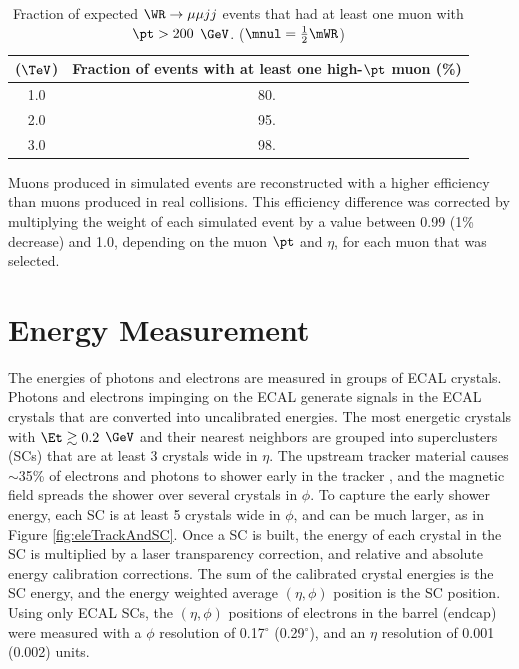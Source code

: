 \begin{table}[h]
	\caption{Fraction of expected $\WR \rightarrow \mu\mu jj$ events that had at least one muon with $\pt > 200$ $\GeV$. 
	($\mnul = \frac{1}{2}\mWR$)}
	\label{tab:wrHighPtMuons}
	\centering
	\begin{tabular}{c|c}
		\mWR ($\TeV$) & Fraction of events with at least one high-$\pt$ muon (\%) \\  \hline
		1.0 &  80.  \\
		2.0 &  95.  \\ 
		3.0 &  98.  \\ \hline
	\end{tabular}
\end{table}

Muons produced in simulated events are reconstructed with a higher efficiency than muons produced in real collisions.  This efficiency 
difference was corrected by multiplying the weight of each simulated event by a value between 0.99 (1\% decrease) and 1.0, depending on 
the muon $\pt$ and $\eta$, for each muon that was selected.


\section{Energy Measurement}
\label{sec:enrgReco}
The energies of photons and electrons are measured in groups of ECAL crystals.  Photons and electrons 
impinging on the ECAL generate signals in the ECAL crystals that are converted into uncalibrated energies.  The most energetic crystals 
with $\Et \gtrsim 0.2$ $\GeV$ and their nearest neighbors are grouped into superclusters (SCs) that are at least 3 crystals wide in 
$\eta$.  The upstream tracker material causes $\sim$35\% of electrons and photons to shower early in the tracker 
\cite{trackerPerformanceInCollisions}, and the magnetic field spreads the shower over several crystals in $\phi$.  To capture the early 
shower energy, each SC is at least 5 crystals wide in $\phi$, and can be much larger, as in Figure \ref{fig:eleTrackAndSC}.  Once a SC 
is built, the energy of each crystal in the SC is multiplied by a laser transparency correction, and relative and absolute energy 
calibration corrections.  The sum of the calibrated crystal energies is the SC energy, and the energy weighted average $(\eta,\phi)$ 
position is the SC position.  Using only ECAL SCs, the $(\eta,\phi)$ positions of electrons in the barrel (endcap) were measured with 
a $\phi$ resolution of 0.17$^{\circ}$ (0.29$^{\circ}$), and an $\eta$ resolution of 0.001 (0.002) units.

